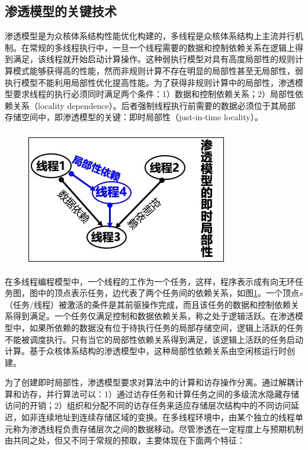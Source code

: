 \begin{flushleft}
\subsection{渗透模型的关键技术}\label{sec:percolation_how}

渗透模型是为众核体系结构性能优化构建的，多线程是众核体系结构上主流并行机制。在常规的多线程执行中，一旦一个线程需要的数据和控制依赖关系在逻辑上得到满足，该线程就开始启动计算操作。这种弱执行模型对具有高度局部性的规则计算模式能够获得高的性能，然而非规则计算不存在明显的局部性甚至无局部性，弱执行模型不能利用局部性优化提高性能。为了获得非规则计算中的局部性，渗透模型要求线程的执行必须同时满足两个条件：1）数据和控制依赖关系；2）局部性依赖关系（locality dependence）。后者强制线程执行前需要的数据必须位于其局部存储空间中，即渗透模型的关键：即时局部性（just-in-time locality）。

\begin{figure}[!htbp]
	\centering
	\includegraphics[clip, scale=0.6]{Img/Chap_Algorithm/percolation_how}
	\label{fig:percolation_how}
\end{figure}

在多线程编程模型中，一个线程的工作为一个任务，这样，程序表示成有向无环任务图，图中的顶点表示任务，边代表了两个任务间的依赖关系，如图\ref{fig:percolation_how}。一个顶点$s$（任务/线程）被激活的条件是其前驱操作完成，而且该任务的数据和控制依赖关系得到满足。一个任务仅满足控制和数据依赖关系，称之处于逻辑活跃。在渗透模型中，如果所依赖的数据没有位于待执行任务的局部存储空间，逻辑上活跃的任务不能被调度执行。只有当它的局部性依赖关系得到满足，该逻辑上活跃的任务启动计算。基于众核体系结构的渗透模型中，这种局部性依赖关系由空闲核运行时创建。

为了创建即时局部性，渗透模型要求对算法中的计算和访存操作分离。通过解耦计算和访存，并行算法可以：1）通过访存任务和计算任务之间的多级流水隐藏存储访问的开销；2）组织和分配不同的访存任务来适应存储层次结构中的不同访问延迟，如非连续地址到连续存储区域的变换。在多线程环境中，由某个独立的线程单元称为渗透线程负责存储层次之间的数据移动。尽管渗透在一定程度上与预期机制由共同之处，但又不同于常规的预取，主要体现在下面两个特征：


\end{flushleft}
